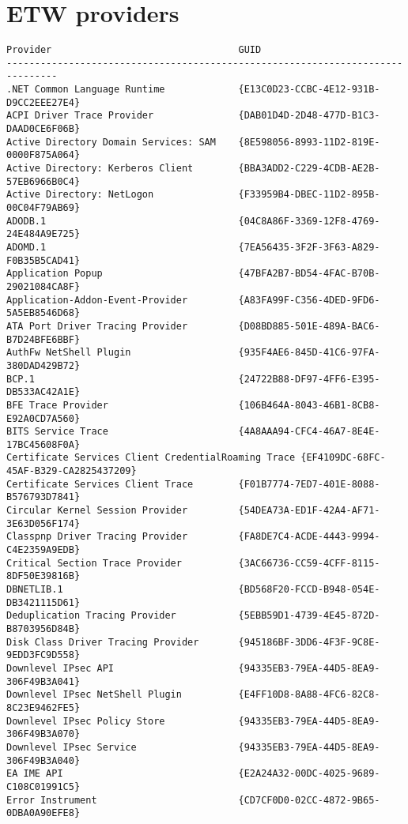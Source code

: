 \documentclass{report}
\begin{document}
\section{ETW providers}
\begin{lstlisting}[breaklines=true,basicstyle=\tiny]
Provider                                 GUID
-------------------------------------------------------------------------------
.NET Common Language Runtime             {E13C0D23-CCBC-4E12-931B-D9CC2EEE27E4}
ACPI Driver Trace Provider               {DAB01D4D-2D48-477D-B1C3-DAAD0CE6F06B}
Active Directory Domain Services: SAM    {8E598056-8993-11D2-819E-0000F875A064}
Active Directory: Kerberos Client        {BBA3ADD2-C229-4CDB-AE2B-57EB6966B0C4}
Active Directory: NetLogon               {F33959B4-DBEC-11D2-895B-00C04F79AB69}
ADODB.1                                  {04C8A86F-3369-12F8-4769-24E484A9E725}
ADOMD.1                                  {7EA56435-3F2F-3F63-A829-F0B35B5CAD41}
Application Popup                        {47BFA2B7-BD54-4FAC-B70B-29021084CA8F}
Application-Addon-Event-Provider         {A83FA99F-C356-4DED-9FD6-5A5EB8546D68}
ATA Port Driver Tracing Provider         {D08BD885-501E-489A-BAC6-B7D24BFE6BBF}
AuthFw NetShell Plugin                   {935F4AE6-845D-41C6-97FA-380DAD429B72}
BCP.1                                    {24722B88-DF97-4FF6-E395-DB533AC42A1E}
BFE Trace Provider                       {106B464A-8043-46B1-8CB8-E92A0CD7A560}
BITS Service Trace                       {4A8AAA94-CFC4-46A7-8E4E-17BC45608F0A}
Certificate Services Client CredentialRoaming Trace {EF4109DC-68FC-45AF-B329-CA2825437209}
Certificate Services Client Trace        {F01B7774-7ED7-401E-8088-B576793D7841}
Circular Kernel Session Provider         {54DEA73A-ED1F-42A4-AF71-3E63D056F174}
Classpnp Driver Tracing Provider         {FA8DE7C4-ACDE-4443-9994-C4E2359A9EDB}
Critical Section Trace Provider          {3AC66736-CC59-4CFF-8115-8DF50E39816B}
DBNETLIB.1                               {BD568F20-FCCD-B948-054E-DB3421115D61}
Deduplication Tracing Provider           {5EBB59D1-4739-4E45-872D-B8703956D84B}
Disk Class Driver Tracing Provider       {945186BF-3DD6-4F3F-9C8E-9EDD3FC9D558}
Downlevel IPsec API                      {94335EB3-79EA-44D5-8EA9-306F49B3A041}
Downlevel IPsec NetShell Plugin          {E4FF10D8-8A88-4FC6-82C8-8C23E9462FE5}
Downlevel IPsec Policy Store             {94335EB3-79EA-44D5-8EA9-306F49B3A070}
Downlevel IPsec Service                  {94335EB3-79EA-44D5-8EA9-306F49B3A040}
EA IME API                               {E2A24A32-00DC-4025-9689-C108C01991C5}
Error Instrument                         {CD7CF0D0-02CC-4872-9B65-0DBA0A90EFE8}

\end{lstlisting}
\end{document}
